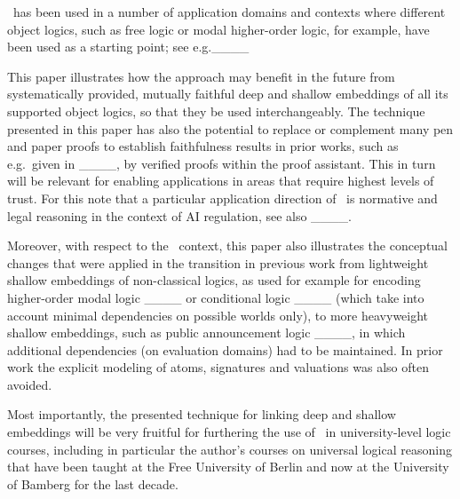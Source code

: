 \logikey\ has been used in a number of application domains and contexts where different object logics, such as free logic or modal higher-order logic, for example, have been used as a starting point; see e.g.____ 

This paper illustrates how the \logikey approach may benefit in the future from systematically provided, mutually faithful deep and shallow embeddings of all its supported object logics, so that they be used interchangeably. 
The technique presented in this paper has also the potential to replace or complement many pen and paper proofs to establish faithfulness results in prior works, such as e.g.~given in ____, by verified proofs within the proof assistant. This in turn will be relevant for enabling applications in areas that require highest levels of trust. For this note that a particular application direction of \logikey\ is normative and legal reasoning in the context of AI regulation, see also ____.

Moreover, with respect to the \logikey\ context, this paper also illustrates the conceptual changes that were applied in the transition in previous work from lightweight shallow embeddings of non-classical logics, as used for example for encoding higher-order modal logic ____ or conditional logic ____ (which take into account minimal dependencies on possible worlds only), to more heavyweight shallow embeddings, such as public announcement logic ____, in which additional dependencies (on evaluation domains) had to be maintained. In prior work the explicit modeling of atoms, signatures and valuations was also often avoided.

Most importantly, the presented technique for linking deep and shallow embeddings will be very fruitful for furthering the use of \logikey\ in university-level logic courses, including in particular the author's courses on universal logical reasoning that have been taught at the Free University of Berlin and now at the University of Bamberg for the last decade.



